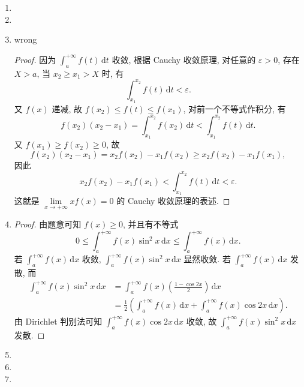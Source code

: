 \documentclass[a4paper, 11pt]{ctexart}
\begin{document}
\begin{enumerate}
    \item %
    \item %
    \item %
        
        {\color{red}wrong}
    \begin{proof}
            因为 $\displaystyle{\int_a^{+\infty}f(t)\,\mathrm{d}t}$ 收敛, 根据 Cauchy 收敛原理, 对任意的 $\varepsilon > 0$, 存在 $X > a$, 当 $x_2 \geq x_1 > X$ 时, 有
            \[
                \int_{x_1}^{x_2}f(t)\,\mathrm{d}t < \varepsilon.    
            \]
            又 $f(x)$ 递减, 故 $f(x_2) \leq f(t) \leq f(x_1)$, 对前一个不等式作积分, 有
            \[
                f(x_2)(x_2 - x_1) = \int_{x_1}^{x_2}f(x_2)\,\mathrm{d}t < \int_{x_1}^{x_2}f(t)\,\mathrm{d}t.
            \]
            又 $f(x_1) \geq f(x_2) \geq 0$, 故
            \[
                f(x_2)(x_2 - x_1) = x_2f(x_2) - x_1f(x_2) \geq x_2f(x_2) - x_1f(x_1),  
            \] 
            因此
            \[
                x_2f(x_2) - x_1f(x_1) < \int_{x_1}^{x_2}f(t)\,\mathrm{d}t < \varepsilon.   
            \]
            这就是 $\lim\limits_{x\to+\infty}xf(x) = 0$ 的 Cauchy 收敛原理的表述.
        \end{proof}
    \item %
        \begin{proof}
            由题意可知 $f(x) \geq 0$, 并且有不等式
            \[
                0 \leq \int_a^{+\infty}f(x)\sin^2x\,\mathrm{d}x \leq \int_a^{+\infty}f(x)\,\mathrm{d}x.    
            \]
            若 $\displaystyle{\int_a^{+\infty}f(x)\,\mathrm{d}x}$ 收敛, $\displaystyle{\int_a^{+\infty}f(x)\sin^2x\,\mathrm{d}x}$ 显然收敛.
            若 $\displaystyle{\int_a^{+\infty}f(x)\,\mathrm{d}x}$ 发散, 而
            \begin{align*}
                \int_a^{+\infty}f(x)\sin^2x\,\mathrm{d}x &= \int_a^{+\infty}f(x)\left(\frac{1-\cos{2x}}{2}\right)\,\mathrm{d}x \\
                &= \frac12\left(\int_a^{+\infty}f(x)\,\mathrm{d}x + \int_a^{+\infty}f(x)\cos{2x}\,\mathrm{d}x\right).  
            \end{align*}
            由 Dirichlet 判别法可知 $\displaystyle{\int_a^{+\infty}f(x)\cos{2x}\,\mathrm{d}x}$ 收敛, 故 $\displaystyle{\int_a^{+\infty}f(x)\sin^2x\,\mathrm{d}x}$ 发散.
        \end{proof}
    \item %
    \item %
    \item %

\end{enumerate}
\end{document}
